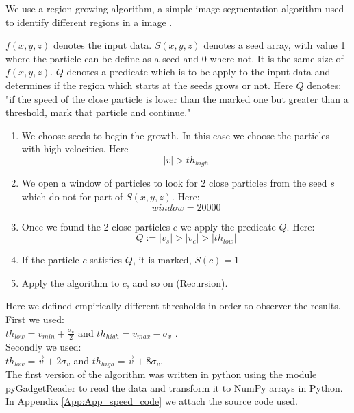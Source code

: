\documentclass[12pt]{article}
\begin{document}
\begin{par}
We use a region growing algorithm, a simple image segmentation algorithm
used to identify different regions in a image \cite{gonzalez_digital_2008}.
\end{par}

\begin{par}
$f(x,y,z)$ denotes the input data. $S(x,y,z)$ denotes a seed array, with
value 1 where the particle can be define as a seed and 0 where not. It is the
same size of $f(x,y,z)$. $Q$ denotes a predicate which is to be apply to the
input data and determines if the region which
 starts at the seeds grows or
not. Here $Q$ denotes: "if the speed of the close
 particle is lower than the
marked one but greater than a threshold, mark that
 particle and continue."
\end{par}

\begin{enumerate}
	\item We choose seeds to begin the growth. In
	 this case we choose the particles with high
	  velocities. Here \[ |v|>  th_{high}\]
	\item We open a window of particles to look
	 for 2 close particles from the seed $s$ which
	  do not for part of $S(x,y,z)$. Here:
    \[ window = 20000\]
    \item Once we found the 2 close particles $c$ we apply the predicate $Q$. Here:
    \[ Q := |v_s| > |v_c| > |th_{low}|\]
    
    \item If the particle $c$ satisfies $Q$, it is
     marked, $S(c) = 1$
    \item Apply the algorithm to $c$, and so on
     (Recursion).
\end{enumerate}

Here we defined empirically different thresholds
 in order to observer the results. \\
First we used:  \\
$th_{low} = v_{min} + \frac{\sigma_{v}}{2} $ and
 $th_{high} = v_{max}  - \sigma_{v}$ .\\
Secondly we used: \\
$th_{low} = \vec{v} + 2  \sigma_{v} $ and $th_{high} = \vec{v}  +  8 \sigma_{v}$.\\

The first version of the algorithm was written in
 python using the module
pyGadgetReader
 \cite{thompson_pygadgetreader_2014ascl_soft11001T}
  to read the
data and transform it to NumPy arrays in Python.
 In Appendix \ref{App:App_speed_code} we attach
  the source code used.
\end{document}
